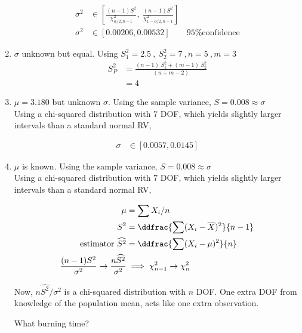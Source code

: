 \begin{enumerate}
		\begin{align}
			\sigma^2 &\in \left[\frac{(n-1)S^2}{\chi^2_{\alpha/2, n-1}} ,\  \frac{(n-1)S^2}{\chi^2_{1 -\alpha/2, n-1}} \right] \nonumber \\
			\sigma^2 &\in \left[ 0.00206, 0.00532 \right] \qquad \text{95\% confidence} 
		\end{align}
	
	
	\item  $ \sigma $ unknown but equal. Using $ S_1^2 = 2.5\ ,\ S_2^2 = 7\ , n = 5\ , m = 3 $\\
	
		\begin{align}
			S_P^2 &= \frac{(n-1)\ S_1^2 + (m-1)\ S_2^2}{(n+m-2)} \nonumber \\
			&= 4
		\end{align}
	
	
	\item  $ \mu = 3.180 $ but unknown $ \sigma $. Using the sample variance, $ S = 0.008 \approx \sigma $\\
	Using a chi-squared distribution with $ 7 $ DOF, which yields slightly larger intervals than a standard normal RV,
	
	
		\begin{align}
			\sigma &\in [0.0057, 0.0145]
		\end{align}
	
	
	\item  $ \mu $ is known. Using the sample variance, $ S = 0.008 \approx \sigma $\\
	Using a chi-squared distribution with $ 7 $ DOF, which yields slightly larger intervals than a standard normal RV,
	
	
		\begin{align}
			\mu &= \sum X_i / n \nonumber \\
			S^2 &= \ddfrac{\sum (X_i - \overline{X})^2}{n-1} \nonumber \\
			\text{estimator } \widehat{S^2} &= \ddfrac{\sum (X_i - \mu)^2}{n} \\
			\frac{(n-1)S^2}{\sigma^2} \to \frac{n\widehat{S^2}}{\sigma^2} &\implies \chi^2_{n-1} \to \chi^2_{n}
		\end{align}
	
	
	Now, $ n \widehat{S^2} /\sigma^2 $ is a chi-squared distribution with $ n $ DOF. One extra DOF from knowledge of the population mean, acts like one extra observation.
	
	What burning time?\\
	

\end{enumerate}

